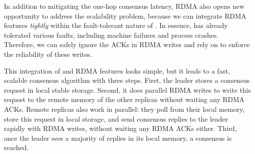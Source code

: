 

% 
In addition to mitigating the one-hop consensus latency, RDMA also opens 
new opportunity to address the \paxos scalability problem, because we
can integrate RDMA features \emph{tightly} within the fault-tolerant nature of 
\paxos. In essence, \paxos has already tolerated various faults, including 
machine failures and process crashes. Therefore, we can safely ignore the ACKs 
in RDMA writes and rely on \paxos to enforce the reliability of these writes.

This integration of \paxos and RDMA features looks simple, but it leads to 
a fast, scalable \paxos consensus algorithm with three steps. First, the leader 
stores a consensus request in local stable storage. Second, it does parallel 
RDMA writes to write this request to the remote memory of the other replicas 
without waiting any RDMA ACKs. Remote replicas also work in parallel: they poll 
from their local memory, store this request in local storage, and send 
consensus replies to the leader rapidly with RDMA writes, without waiting any 
RDMA ACKs either. Third, once the leader sees a majority of replies in its 
local memory, a consensus is reached.

